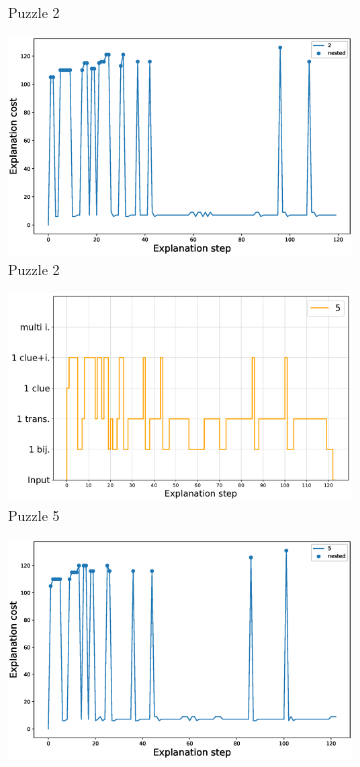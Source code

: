 \begin{figure}[t!]
\begin{subfigure}{.5\textwidth}
		\caption{Puzzle 2}
		\label{fig:composition_puzzle:p2}
	\end{subfigure}%
	\begin{subfigure}{.5\textwidth}
		\centering
		\includegraphics[width=0.84\linewidth]{figures/2.eps}
		\caption{Puzzle 2}
		\label{fig:cost_puzzle:p2}
	\end{subfigure}
	\begin{subfigure}{.5\textwidth}
		\centering
		\includegraphics[width=0.9\linewidth]{figures/plot_cost_steps_5.pdf}
		\caption{Puzzle 5}
		\label{fig:composition_puzzle:p5}
	\end{subfigure}%
	\begin{subfigure}{.5\textwidth}
		\centering
		\includegraphics[width=0.84\linewidth]{figures/5.eps}

\end{subfigure}
\end{figure}
